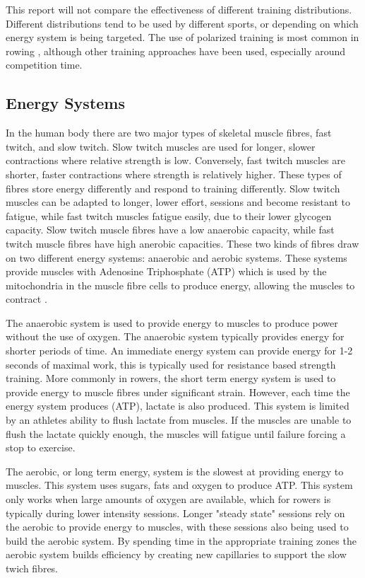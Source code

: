 This report will not compare the effectiveness of different training distributions. Different distributions tend to be used by different sports, or depending on which energy system is being targeted. The use of polarized training is most common in rowing \autocite{Rosenblat2019}, although other training approaches have been used, especially around competition time.


\subsection{Energy Systems}
\label{sub:energy_systems}
In the human body there are two major types of skeletal muscle fibres, fast twitch, and slow twitch. Slow twitch muscles are used for longer, slower contractions where relative strength is low. Conversely, fast twitch muscles are shorter, faster contractions where strength is relatively higher. These types of fibres store energy differently and respond to training differently. Slow twitch muscles can be adapted to longer, lower effort, sessions and become resistant to fatigue, while fast twitch muscles fatigue easily, due to their lower glycogen capacity. Slow twitch muscle fibres have a low anaerobic capacity, while fast twitch muscle fibres have high anerobic capacities. These two kinds of fibres draw on two different energy systems: anaerobic and aerobic systems. These systems provide muscles with Adenosine Triphosphate (ATP) which is used by the mitochondria in the muscle fibre cells to produce energy, allowing the muscles to contract \cite{Göktepe2007}. 

The anaerobic system is used to provide energy to muscles to produce power without the use of oxygen. The anaerobic system typically provides energy for shorter periods of time. An immediate energy system can provide energy for 1-2 seconds of maximal work, this is typically used for resistance based strength training. More commonly in rowers, the short term energy system is used to provide energy to muscle fibres under significant strain. However, each time the energy system produces (ATP), lactate is also produced. This system is limited by an athletes ability to flush lactate from muscles. If the muscles are unable to flush the lactate quickly enough, the muscles will fatigue until failure forcing a stop to exercise. 

The aerobic, or long term energy, system is the slowest at providing energy to muscles. This system uses sugars, fats and oxygen to produce ATP. This system only works when large amounts of oxygen are available, which for rowers is typically during lower intensity sessions. Longer "steady state" sessions rely on the aerobic to provide energy to muscles, with these sessions also being used to build the aerobic system. By spending time in the appropriate training zones the aerobic system builds efficiency by creating new capillaries to support the slow twich fibres.

